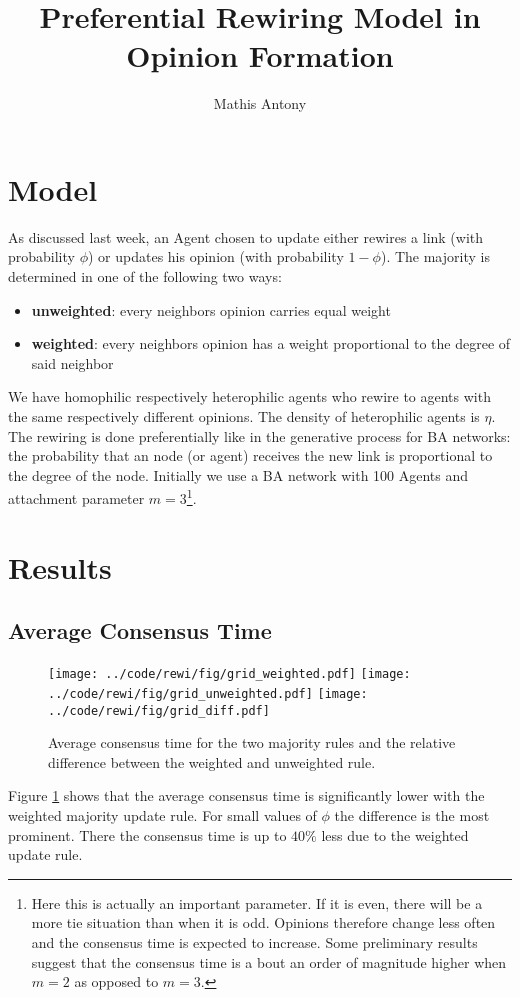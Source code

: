 \documentclass[a4paper,12pt]{scrartcl}
\title{Preferential Rewiring Model in Opinion Formation}
\author{Mathis Antony}
\newcommand{\figwidth}{0.49\linewidth}
\begin{document}
\maketitle
\section{Model}
As discussed last week, an Agent chosen to update either rewires a link (with probability $\phi$) or updates his opinion (with probability $1-\phi$). The majority is determined in one of the following two ways:
\begin{itemize}
\item \textbf{unweighted}: every neighbors opinion carries equal weight
\item \textbf{weighted}: every neighbors opinion has a weight proportional to the degree of said neighbor
\end{itemize}
We have homophilic respectively heterophilic agents who rewire to agents with the same respectively different opinions. The density of heterophilic agents is $\eta$. The rewiring is done preferentially like in the generative process for BA networks: the probability that an node (or agent) receives the new link is proportional to the degree of the node. Initially we use a BA network with 100 Agents and attachment parameter $m=3$\footnote{Here this is actually an important parameter. If it is even, there will be a more tie situation than when it is odd. Opinions therefore change less often and the consensus time is expected to increase. Some preliminary results suggest that the consensus time is a bout an order of magnitude higher when $m=2$ as opposed to $m=3$.}.

\section{Results}
\subsection{Average Consensus Time}
\begin{figure}
\centering
\texttt{[image: ../code/rewi/fig/grid\_weighted.pdf]}
\texttt{[image: ../code/rewi/fig/grid\_unweighted.pdf]}
\texttt{[image: ../code/rewi/fig/grid\_diff.pdf]}
\caption{Average consensus time for the two majority rules and the relative difference between the weighted and unweighted rule.}
\label{fig:1}
\end{figure}
Figure \ref{fig:1} shows that the average consensus time is significantly lower with the weighted majority update rule. For small values of $\phi$ the difference is the most prominent. There the consensus time is up to $40\%$ less due to the weighted update rule.
\end{document}
